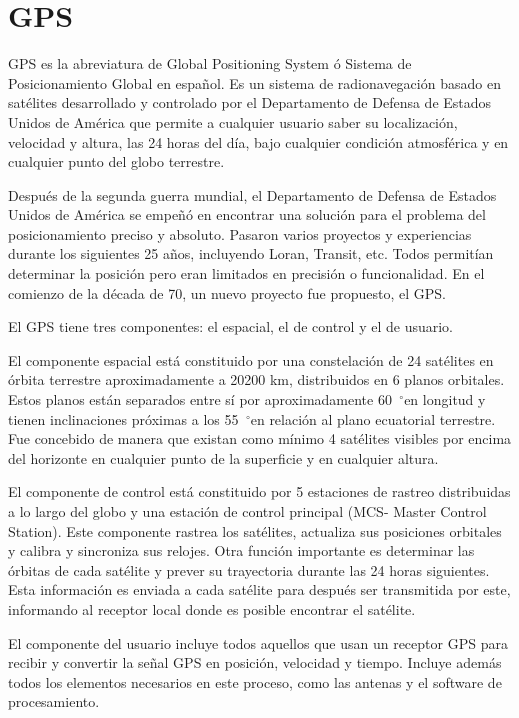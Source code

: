 \section{GPS}

\newcommand{\grad}{\hspace{-2mm}$\phantom{a}^{\circ}$}

GPS es la abreviatura de Global Positioning System ó Sistema de Posicionamiento Global en español. Es un sistema de radionavegación basado en satélites desarrollado y controlado por el Departamento de Defensa de Estados Unidos de América que permite a cualquier usuario saber su localización, velocidad y altura, las 24 horas del día, bajo cualquier condición atmosférica y en cualquier punto del globo terrestre. 

Después de la segunda guerra mundial, el Departamento de Defensa de Estados Unidos de América se empeñó en encontrar una solución para el problema del posicionamiento preciso y absoluto. Pasaron varios proyectos y experiencias durante los siguientes 25 años, incluyendo Loran, Transit, etc. Todos permitían determinar la posición pero eran limitados en precisión o funcionalidad. En el comienzo de la década de 70, un nuevo proyecto fue propuesto, el GPS. 

El GPS tiene tres componentes: el espacial, el de control y el de usuario.

El componente espacial está constituido por una constelación de 24 satélites en órbita terrestre aproximadamente a 20200 km, distribuidos en 6 planos orbitales. Estos planos están separados entre sí por aproximadamente 60\grad  en longitud y tienen inclinaciones próximas a los 55\grad  en relación al plano ecuatorial terrestre. Fue concebido de manera que existan como mínimo 4 satélites visibles por encima del horizonte en cualquier punto de la superficie y en cualquier altura.

El componente de control está constituido por 5 estaciones de rastreo distribuidas a lo largo del globo y una estación de control principal (MCS- Master Control Station). Este componente rastrea los satélites, actualiza sus posiciones orbitales y calibra y sincroniza sus relojes. Otra función importante es determinar las órbitas de cada satélite y prever su trayectoria durante las 24 horas siguientes. Esta información es enviada a cada satélite para después ser transmitida por este, informando al receptor local donde es posible encontrar el satélite. 

El componente del usuario incluye todos aquellos que usan un receptor GPS para recibir y convertir la señal GPS en posición, velocidad y tiempo. Incluye además todos los elementos necesarios en este proceso, como las antenas y el software de procesamiento. 

